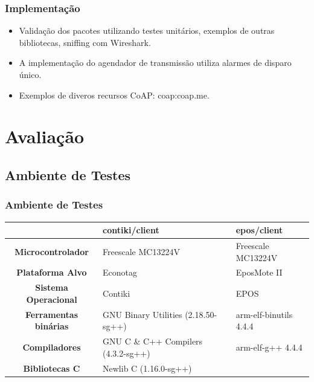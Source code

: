 \documentclass{beamer}
\begin{document}
\begin{frame}
\frametitle{Implementação}
\begin{itemize}
    \item Validação dos pacotes utilizando testes unitários, exemplos de outras bibliotecas, sniffing com Wireshark.
    \item A implementação do agendador de transmissão utiliza alarmes de disparo único.
    \item Exemplos de diveros recursos CoAP: coap:coap.me.
\end{itemize}
\end{frame}

\section{Avaliação}

\subsection{Ambiente de Testes}
\begin{frame}
\frametitle{Ambiente de Testes}
 \begin{table}[!ht]
  \centering
  \scriptsize
  \begin{tabular}{|c|p{3cm}|p{3cm}|}
	\hline
	& \textbf{contiki/client} & \textbf{epos/client}  \\ \hline
	\textbf{Microcontrolador}	  	  & Freescale MC13224V & Freescale MC13224V \\ \hline 
	\textbf{Plataforma Alvo}    & Econotag & EposMote II\\ \hline    
	\textbf{Sistema Operacional}    & Contiki & EPOS \\ \hline    
    \textbf{Ferramentas binárias}		  & GNU Binary Utilities (2.18.50-sg++) & arm-elf-binutils 4.4.4 \\ \hline
    \textbf{Compiladores}		  & GNU C \& C++ Compilers (4.3.2-sg++) & arm-elf-g++ 4.4.4\\ \hline
    \textbf{Bibliotecas C}          & Newlib C (1.16.0-sg++) & \\ \hline 
	\end{tabular}
  \end{table}
\end{frame}
\end{document}
